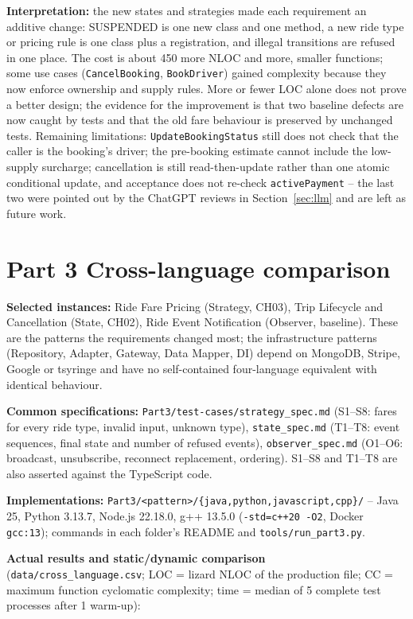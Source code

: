 \documentclass[11pt,a4paper]{article}
\begin{document}
\textbf{Interpretation:} the new states and strategies made each requirement an additive change: SUSPENDED is one new class and one
method, a new ride type or pricing rule is one class plus a registration, and illegal transitions are refused in one place. The cost is
about 450 more NLOC and more, smaller functions; some use cases (\texttt{CancelBooking}, \texttt{BookDriver}) gained complexity because they
now enforce ownership and supply rules. More or fewer LOC alone does not prove a better design; the evidence for the improvement is
that two baseline defects are now caught by tests and that the old fare behaviour is preserved by unchanged tests. Remaining limitations:
\texttt{UpdateBookingStatus} still does not check that the caller is the booking's driver; the pre-booking estimate cannot include the
low-supply surcharge; cancellation is still read-then-update rather than one atomic conditional update, and acceptance does not re-check
\texttt{activePayment} -- the last two were pointed out by the ChatGPT reviews in Section~\ref{sec:llm} and are left as future work.

\section{Part 3 Cross-language comparison}
\textbf{Selected instances:} Ride Fare Pricing (Strategy, CH03), Trip Lifecycle and Cancellation (State, CH02), Ride Event Notification
(Observer, baseline). These are the patterns the requirements changed most; the infrastructure patterns (Repository, Adapter, Gateway,
Data Mapper, DI) depend on MongoDB, Stripe, Google or tsyringe and have no self-contained four-language equivalent with identical behaviour.

\textbf{Common specifications:} \texttt{Part3/test-cases/strategy\_spec.md} (S1--S8: fares for every ride type, invalid input, unknown type),
\texttt{state\_spec.md} (T1--T8: event sequences, final state and number of refused events), \texttt{observer\_spec.md} (O1--O6:
broadcast, unsubscribe, reconnect replacement, ordering). S1--S8 and T1--T8 are also asserted against the TypeScript code.

\textbf{Implementations:} \texttt{Part3/<pattern>/\{java,python,javascript,cpp\}/} -- Java 25, Python 3.13.7, Node.js 22.18.0, g++ 13.5.0
(\texttt{-std=c++20 -O2}, Docker \texttt{gcc:13}); commands in each folder's README and \texttt{tools/run\_part3.py}.

\textbf{Actual results and static/dynamic comparison} (\texttt{data/cross\_language.csv}; LOC = lizard NLOC of the production file;
CC = maximum function cyclomatic complexity; time = median of 5 complete test processes after 1 warm-up):
\end{document}
